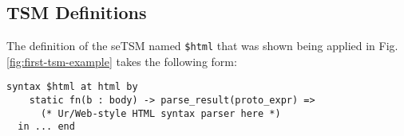 \documentclass[acmlarge,review,anonymous]{acmart}\settopmatter{printfolios=true}
\newcommand{\li}[1]{\lstinline{#1}}
\begin{document}



\subsection{TSM Definitions}\label{sec:uetsms-definition}
The definition of the seTSM named \lstinline{$html} that was shown being applied in Fig. \ref{fig:first-tsm-example} takes the following form:
\begin{lstlisting}[mathescape=|]
  syntax $html at html by 
    static fn(b : body) -> parse_result(proto_expr) => 
      (* Ur/Web-style HTML syntax parser here *)
  in ... end 
\end{lstlisting}
\end{document}
